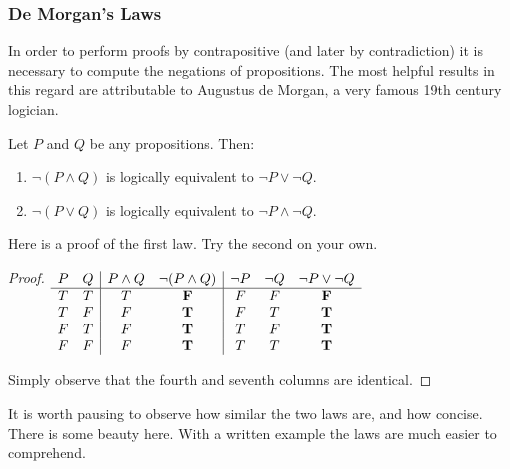  
\subsubsection*{De Morgan's Laws}

In order to perform proofs by contrapositive (and later by contradiction) it is necessary to compute the negations of propositions. The most helpful results in this regard are attributable to Augustus de Morgan, a very famous 19th century logician.


\begin{thm}\label{thm:demorgan}
Let $P$ and $Q$ be any propositions. Then:
\begin{enumerate}\setlength{\itemsep}{0pt}
  \item $\neg(P\wedge Q)$ is logically equivalent to  $\neg P\vee\neg Q$.
  \item $\neg(P\vee Q)$ is logically equivalent to $\neg P\wedge\neg Q$.
\end{enumerate}
\end{thm}


\noindent Here is a proof of the first law. Try the second on your own.

\begin{proof}
$\begin{array}[t]{cc|cc|ccc}
P & Q & P\wedge Q & \neg(P\wedge Q) & \neg P & \neg Q & \neg P\vee\neg Q\\\hline
T & T & T & \mathbf F & F & F & \mathbf F\\
T & F & F & \mathbf T & F & T & \mathbf T\\
F & T & F & \mathbf T & T & F & \mathbf T\\
F & F & F & \mathbf T & T & T & \mathbf T
\end{array}$

Simply observe that the fourth and seventh columns are identical.
\end{proof}

\noindent It is worth pausing to observe how similar the two laws are, and how concise. There is some beauty here. With a written example the laws are much easier to comprehend. 

